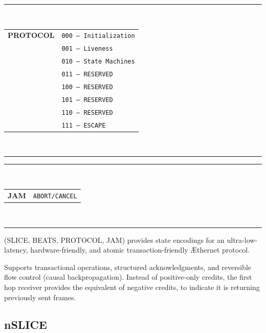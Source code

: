 \documentclass[../OAE-SPEC-MAIN.tex]{subfiles}
\begin{document}
\begin{margintable}
  \centering
  \footnotesize
  \rule{5.4cm}{0.8pt}\\
  \begin{tabular}{@{}cl@{}}
    \textbf{PROTOCOL} & \texttt{000 — Initialization} \\
                      & \texttt{001 — Liveness} \\
                      & \texttt{010 — State Machines} \\
                      & \texttt{011 — RESERVED} \\
                      & \texttt{100 — RESERVED} \\
                      & \texttt{101 — RESERVED} \\
                      & \texttt{110 — RESERVED} \\
                      & \texttt{111 — ESCAPE} \\
  \end{tabular}\\
  \rule{5.4cm}{0.6pt}
\end{margintable}

\begin{margintable}
  \centering
  \footnotesize
  \rule{5.4cm}{0.8pt}\\
  \begin{tabular}{@{}cl@{}}
    \textbf{JAM} & \texttt{ABORT/CANCEL} \\
  \end{tabular}\\
  \rule{5.4cm}{0.6pt}
\end{margintable}

(SLICE, BEATS, PROTOCOL, JAM) provides state encodings for an ultra-low-latency, hardware-friendly, and atomic transaction-friendly \AE thernet protocol.

Supports transactional operations, structured acknowledgments, and reversible flow control (causal backpropagation). Instead of positive-only credits, the first hop receiver provides the equivalent of negative credits, to indicate it is returning previously sent frames. %

\subsection{nSLICE}
\end{document}
